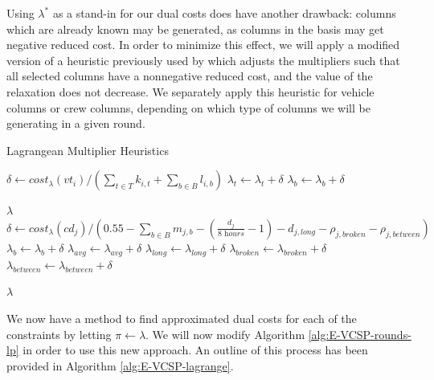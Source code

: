 \documentclass[]{article}
\begin{document}
Using $\lambda^*$ as a stand-in for our dual costs does have another drawback: columns which are already known may be generated, as columns in the basis may get negative reduced cost. In order to minimize this effect, we will apply a modified version of a heuristic previously used by \citet{vanKootenNiekerk2017, Freling1997, Carraresi1995} which adjusts the multipliers such that all selected columns have a nonnegative reduced cost, and the value of the relaxation does not decrease. We separately apply this heuristic for vehicle columns or crew columns, depending on which type of columns we will be generating in a given round.
\begin{algorithm}[h]
\caption{Lagrangean Multiplier Heuristics}\label{alg:lagrange-multiplier-vt}
\begin{algorithmic}
 
  \State $\delta \gets cost_\lambda(vt_i) / (\sum_{t \in T} k_{i,t} + \sum_{b \in B} l_{i,b})$
    \State $\lambda_{t} \gets \lambda_{t} + \delta$
  \EndFor
    \State $\lambda_{b} \gets \lambda_{b} + \delta$
  \EndFor
\EndFor

\Return $\lambda$
\EndProcedure\\
 
    \State $\delta \gets cost_\lambda(cd_j) / (0.55 - \sum_{b \in B} m_{j,b} - (\frac{d_{j}}{\textit{8 hours}} - 1) - d_{j,\textit{long}} - \rho_{j,\textit{broken}} - \rho_{j,\textit{between}})$
      \State $\lambda_{b} \gets \lambda_{b} + \delta$
    \EndFor
    \State $\lambda_{avg} \gets \lambda_{avg} + \delta$
    \State $\lambda_{long} \gets \lambda_{long} + \delta$
    \State $\lambda_{broken} \gets \lambda_{broken} + \delta$
    \State $\lambda_{between} \gets \lambda_{between} + \delta$
  \EndFor

\Return $\lambda$
\EndProcedure
\end{algorithmic} 
\end{algorithm}

We now have a method to find approximated dual costs for each of the constraints by letting $\pi \gets \lambda$. We will now modify Algorithm \ref{alg:E-VCSP-rounds-lp} in order to use this new approach. An outline of this process has been provided in Algorithm \ref{alg:E-VCSP-lagrange}.
\end{document}
